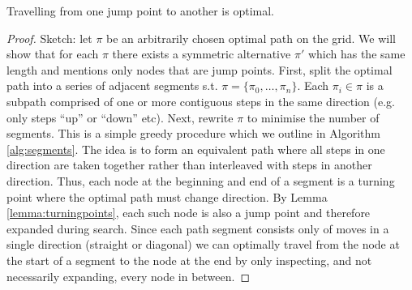 \begin{theorem}
Travelling from one jump point to another is optimal.
\end{theorem}
\begin{proof}
Sketch: let $\pi$ be an arbitrarily chosen optimal path on the grid. 
We will show that for each $\pi$ there exists a symmetric alternative $\pi'$
which has the same length and mentions only nodes that are jump points.
First, split the optimal path into a series of adjacent segments s.t. $\pi = \lbrace \pi_{0}, \ldots, \pi_{n}
\rbrace$. Each $\pi_{i} \in \pi$ is a subpath comprised of one or more
contiguous steps in the same direction (e.g. only steps ``up'' or ``down'' etc).
Next, rewrite $\pi$ to minimise the number of segments.
This is a simple greedy procedure which we outline in Algorithm
\ref{alg:segments}. The idea is to form an equivalent path where all steps in one direction are taken 
together rather than interleaved with steps in another direction. 
Thus, each node at the beginning and end of a segment is a turning point where 
the optimal path must change direction.
By Lemma \ref{lemma:turningpoints}, each such node is also a jump point and therefore 
expanded during search.
Since each path segment consists only of moves in a single direction
(straight or diagonal) we can optimally travel from the node at the start of a
segment to the node at the end by only inspecting, and not necessarily expanding, every node
in between.
\end{proof}
